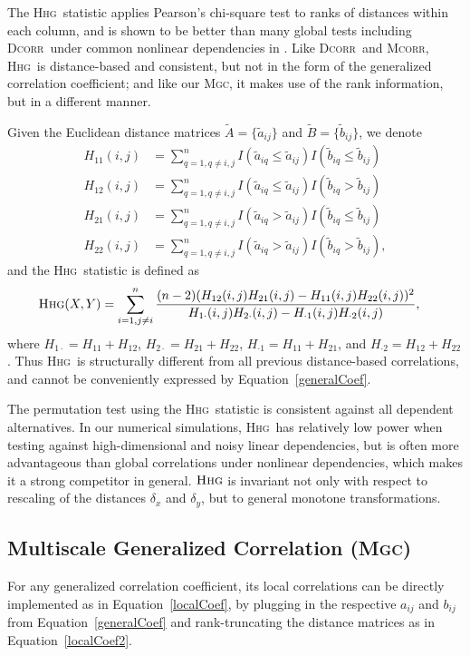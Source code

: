\documentclass[11pt]{article}
\providecommand{\sct}[1]{{\normalfont\textsc{#1}}}
\newcommand{\Mgc}{\sct{Mgc}}
\newcommand{\Hhg}{\sct{Hhg}}
\newcommand{\Dcorr}{\sct{Dcorr}}
\newcommand{\Mcorr}{\sct{Mcorr}}
\begin{document}
The \Hhg~statistic applies Pearson's chi-square test to ranks of distances within each column, and is shown to be better than many global tests including \Dcorr~under common nonlinear dependencies in \cite{GorfineHellerHeller2012, HellerGorfine2013}. Like \Dcorr~and \Mcorr, \Hhg~is distance-based and consistent, but not in the form of the generalized correlation coefficient; and like our \Mgc, it makes use of the rank information, but in a different manner.

Given the Euclidean distance matrices $\tilde{A}=\{\tilde{a}_{ij}\}$ and $\tilde{B}=\{\tilde{b}_{ij}\}$, we denote
\begin{align*}
H_{11}(i,j) &= \sum_{q=1,q\neq i,j}^{n}I(\tilde{a}_{iq} \leq \tilde{a}_{ij})I(\tilde{b}_{iq} \leq \tilde{b}_{ij}) \\
H_{12}(i,j) &= \sum_{q=1,q\neq i,j}^{n}I(\tilde{a}_{iq} \leq \tilde{a}_{ij})I(\tilde{b}_{iq} > \tilde{b}_{ij}) \\
H_{21}(i,j) &= \sum_{q=1,q\neq i,j}^{n}I(\tilde{a}_{iq} > \tilde{a}_{ij})I(\tilde{b}_{iq} \leq \tilde{b}_{ij}) \\
H_{22}(i,j) &= \sum_{q=1,q\neq i,j}^{n}I(\tilde{a}_{iq} > \tilde{a}_{ij})I(\tilde{b}_{iq} > \tilde{b}_{ij}),
\end{align*}
and the \Hhg~statistic is defined as
\begin{align*}
\Hhg(X,Y) &= \sum_{i=1,j\neq i}^{n} \frac{(n-2)(H_{12}(i,j)H_{21}(i,j)-H_{11}(i,j)H_{22}(i,j))^2}{H_{1 \cdot}(i,j)H_{2 \cdot}(i,j)-H_{\cdot 1}(i,j)H_{\cdot 2}(i,j)},
\end{align*}
where $H_{1 \cdot}=H_{11}+H_{12}$, $H_{2 \cdot}=H_{21}+H_{22}$, $H_{\cdot 1}=H_{11}+H_{21}$, and $H_{\cdot 2}=H_{12}+H_{22}$. Thus \Hhg~is structurally different from all previous distance-based correlations, and cannot be conveniently expressed by Equation~\ref{generalCoef}.

The permutation test using the \Hhg~statistic is consistent against all dependent alternatives. In our numerical simulations, \Hhg~has relatively low power  when testing against high-dimensional and noisy linear dependencies, but is often more advantageous than global correlations under nonlinear dependencies, which makes it a strong competitor in general.
$\Hhg$ is invariant not only with respect to rescaling of the distances $\delta_x$ and $\delta_y$, but to general monotone transformations.

\subsection{Multiscale Generalized Correlation (\Mgc)}
\label{appen:mgc}
For any generalized correlation coefficient, its local correlations can be directly implemented as in Equation~\ref{localCoef}, by plugging in the respective $a_{ij}$ and $b_{ij}$ from Equation~\ref{generalCoef} and rank-truncating  the distance matrices  as in Equation~\ref{localCoef2}. 
\end{document}
